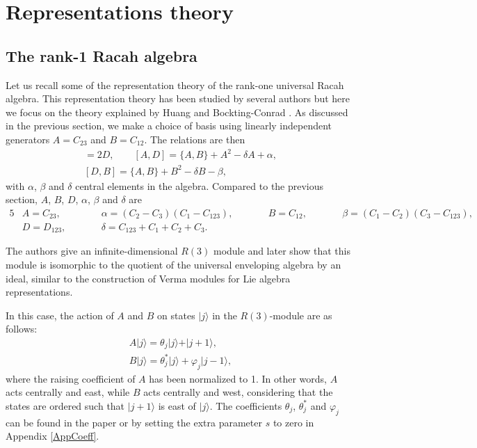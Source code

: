 \documentclass[10pt,a4paper]{amsart}
\numberwithin{equation}{section}
\begin{document}
\section{Representations theory}
\label{repn}
\subsection{The rank-1 Racah algebra}\label{rankone}
Let us recall some of the representation theory of the rank-one universal Racah algebra. This representation theory has been studied by several authors but here we focus on the theory explained by Huang and Bockting-Conrad \cite{HBC2020}. As discussed in the previous section, we make a choice of basis using linearly independent generators $A=C_{23}$ and $B=C_{12}$. The relations are then
\begin{gather}%
[A,B]=2D,\qquad
[A,D]= \lbrace A,B\rbrace+A^2-\delta A +\alpha,\label{Pres11}\\
[D,B]=\lbrace A,B\rbrace+B^2-\delta B -\beta,\label{Pres13}
\end{gather}
with $\alpha$, $\beta$ and $\delta$ central elements in the algebra. Compared to the previous section, $A$, $B$, $D$, $\alpha$, $\beta$ and $\delta$ are
\begin{alignat*}{5}
&A=C_{23},\qquad&& \alpha=(C_2-C_3)(C_1-C_{123}),\qquad&&
B=C_{12}, \qquad&& \beta=(C_1-C_2)(C_3-C_{123}),&\\
&D=D_{123},\qquad&&\delta=C_{123}+C_1+C_2+C_3.&&&&&
\end{alignat*}

The authors give an infinite-dimensional $R(3)$ module \cite[Proposition~3.1]{HBC2020} and later show that this module is isomorphic to the quotient of the universal enveloping algebra by an ideal, similar to the construction of Verma modules for Lie algebra representations.


In this case, the action of $A$ and $B$ on states $\vert j\rangle$ in the $R(3)$-module are as follows:
\begin{gather}
A\vert j\rangle=\theta_j\vert j\rangle+\vert j+1\rangle,\label{actionA}\\
B\vert j\rangle=\theta^*_j\vert j\rangle+\varphi_j\vert j-1\rangle,\label{actionB}
\end{gather}
where the raising coefficient of $A$ has been normalized to 1. In other words, $A$ acts centrally and east, while $B$ acts centrally and west, considering that the states are ordered such that $\vert j+1\rangle$ is east of $\vert j\rangle$. The coefficients $\theta_j$, $\theta_j^*$ and $\varphi_j$ can be found in the paper \cite{HBC2020} or by setting the extra parameter $s$ to zero in Appendix \ref{AppCoeff}.
\end{document}
